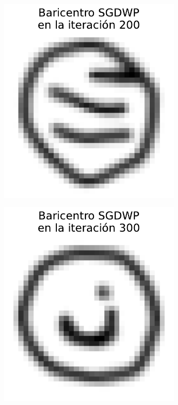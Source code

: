 \begin{figure}[H]
\begin{subfigure}[b]{0.17\textwidth}
        \centering
        \includegraphics[width=\textwidth]{img/sgdwp-rw/bar-SGDWP-random-walk-iter-02.pdf}
        \label{fig:bar-SGDWP-random-walk-iter-02}
    \end{subfigure}
    \hfill
    \begin{subfigure}[b]{0.17\textwidth}
        \centering
        \includegraphics[width=\textwidth]{img/sgdwp-rw/bar-SGDWP-random-walk-iter-03.pdf}

\end{subfigure}
\end{figure}
